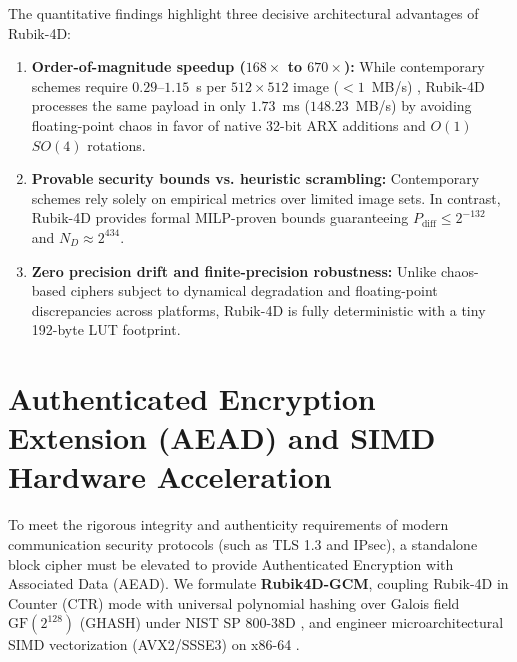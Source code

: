 \documentclass[10pt,twocolumn]{article}
\begin{document}
The quantitative findings highlight three decisive architectural advantages of Rubik-4D:
\begin{enumerate}
    \item \textbf{Order-of-magnitude speedup ($168\times$ to $670\times$):} While contemporary schemes require $0.29$--$1.15$~s per $512 \times 512$ image ($< 1$~MB/s) \cite{zhao2022quantum, nair2024rubik}, Rubik-4D processes the same payload in only $1.73$~ms ($148.23$~MB/s) by avoiding floating-point chaos in favor of native 32-bit ARX additions and $O(1)$ $SO(4)$ rotations.
    \item \textbf{Provable security bounds vs. heuristic scrambling:} Contemporary schemes rely solely on empirical metrics over limited image sets. In contrast, Rubik-4D provides formal MILP-proven bounds guaranteeing $P_{\text{diff}} \le 2^{-132}$ and $N_D \approx 2^{434}$.
    \item \textbf{Zero precision drift and finite-precision robustness:} Unlike chaos-based ciphers subject to dynamical degradation and floating-point discrepancies across platforms, Rubik-4D is fully deterministic with a tiny 192-byte LUT footprint.
\end{enumerate}

\section{Authenticated Encryption Extension (AEAD) and SIMD Hardware Acceleration}
\label{sec:aead_simd}

To meet the rigorous integrity and authenticity requirements of modern communication security protocols (such as TLS 1.3 and IPsec), a standalone block cipher must be elevated to provide Authenticated Encryption with Associated Data (AEAD). We formulate \textbf{Rubik4D-GCM}, coupling Rubik-4D in Counter (CTR) mode with universal polynomial hashing over Galois field $\text{GF}(2^{128})$ (GHASH) under NIST SP 800-38D \cite{dworkin2007gcm,mcgrew2004gcm}, and engineer microarchitectural SIMD vectorization (AVX2/SSSE3) on x86-64 \cite{intel2023manual,gueron2010intel}.
\end{document}
